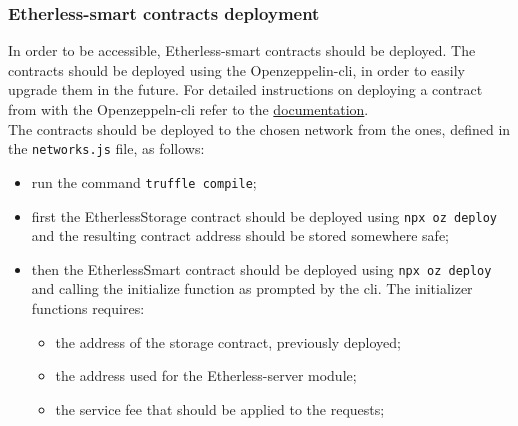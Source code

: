 \subsubsection{Etherless-smart contracts deployment}
	In order to be accessible, Etherless-smart contracts should be deployed. The contracts should be deployed using the Openzeppelin-cli, in order to easily upgrade them in the future. For detailed instructions on deploying a contract from with the Openzeppeln-cli refer to the \href{https://docs.openzeppelin.com/learn/deploying-and-interacting#deploying-a-smart-contract}{documentation}.\\
	The contracts should be deployed to the chosen network from the ones, defined in the \texttt{networks.js} file, as follows:
	\begin{itemize}
		\item run the command \texttt{truffle compile};
		\item first the EtherlessStorage contract should be deployed using \texttt{npx oz deploy} and the resulting contract address should be stored somewhere safe;
		\item then the EtherlessSmart contract should be deployed using \texttt{npx oz deploy} and calling the initialize function as prompted by the cli. The initializer functions requires:
		\begin{itemize}
			\item the address of the storage contract, previously deployed;
			\item the address used for the Etherless-server module;
			\item the service fee that should be applied to the requests;
		\end{itemize}
	\end{itemize}

